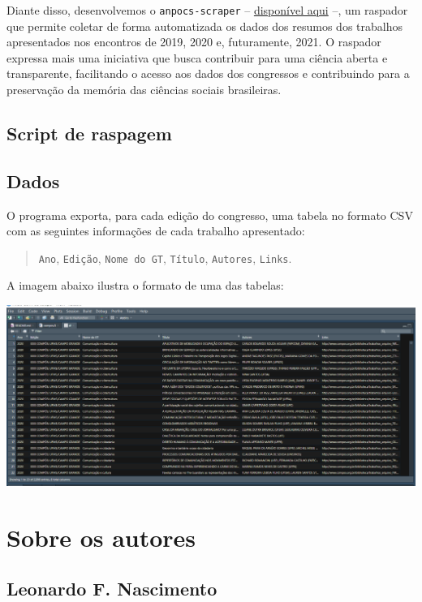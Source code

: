 \documentclass[
]{book}
\begin{document}
Diante disso, desenvolvemos o \texttt{anpocs-scraper} -- \href{https://github.com/vmussa/anpocs-scraper}{disponível aqui} --, um raspador que permite coletar de forma automatizada os dados dos resumos dos trabalhos apresentados nos encontros de 2019, 2020 e, futuramente, 2021. O raspador expressa mais uma iniciativa que busca contribuir para uma ciência aberta e transparente, facilitando o acesso aos dados dos congressos e contribuindo para a preservação da memória das ciências sociais brasileiras.

\hypertarget{script-de-raspagem-1}{%
\section{Script de raspagem}\label{script-de-raspagem-1}}

\hypertarget{dados-3}{%
\section{Dados}\label{dados-3}}

O programa exporta, para cada edição do congresso, uma tabela no formato CSV com as seguintes informações de cada trabalho apresentado:

\begin{quote}
\texttt{Ano}, \texttt{Edição}, \texttt{Nome\ do\ GT}, \texttt{Título}, \texttt{Autores}, \texttt{Links}.
\end{quote}

A imagem abaixo ilustra o formato de uma das tabelas:

\includegraphics{img/csv.png}

\hypertarget{sobre-os-autores}{%
\chapter{Sobre os autores}\label{sobre-os-autores}}

\hypertarget{leonardo-f.-nascimento}{%
\section{Leonardo F. Nascimento}\label{leonardo-f.-nascimento}}
\end{document}
